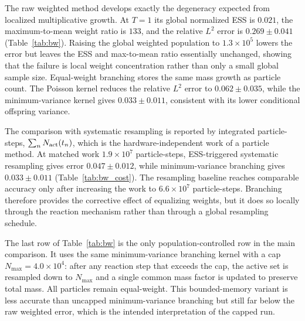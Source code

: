 \documentclass[a4paper,fleqn]{cas-sc}
\theoremstyle{definition}
\theoremstyle{remark}
\begin{document}
The raw weighted method develops exactly the degeneracy expected from localized multiplicative growth.  At $T=1$ its global normalized ESS is $0.021$, the maximum-to-mean weight ratio is $133$, and the relative $L^2$ error is $0.269\pm0.041$ (Table~\ref{tab:bw}).  Raising the global weighted population to $1.3\times10^5$ lowers the error but leaves the ESS and max-to-mean ratio essentially unchanged, showing that the failure is local weight concentration rather than only a small global sample size.  Equal-weight branching stores the same mass growth as particle count.  The Poisson kernel reduces the relative $L^2$ error to $0.062\pm0.035$, while the minimum-variance kernel gives $0.033\pm0.011$, consistent with its lower conditional offspring variance.

The comparison with systematic resampling is reported by integrated particle-steps, $\sum_n N_{\rm act}(t_n)$, which is the hardware-independent work of a particle method.  At matched work $1.9\times10^7$ particle-steps, ESS-triggered systematic resampling gives error $0.047\pm0.012$, while minimum-variance branching gives $0.033\pm0.011$ (Table~\ref{tab:bw_cost}).  The resampling baseline reaches comparable accuracy only after increasing the work to $6.6\times10^7$ particle-steps.  Branching therefore provides the corrective effect of equalizing weights, but it does so locally through the reaction mechanism rather than through a global resampling schedule.

The last row of Table~\ref{tab:bw} is the only population-controlled row in the main comparison.  It uses the same minimum-variance branching kernel with a cap $N_{\max}=4.0\times10^4$: after any reaction step that exceeds the cap, the active set is resampled down to $N_{\max}$ and a single common mass factor is updated to preserve total mass.  All particles remain equal-weight.  This bounded-memory variant is less accurate than uncapped minimum-variance branching but still far below the raw weighted error, which is the intended interpretation of the capped run.
\end{document}
